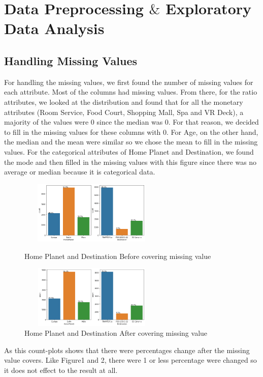 \documentclass[fleqn,10pt]{SelfArx} %
\begin{document}
\bigskip
\bigskip


\section{Data Preprocessing $\&$ Exploratory Data Analysis} %

\subsection{Handling Missing Values}
For handling the missing values, we first found the number of missing values for each attribute. Most of the columns had missing values. From there, for the ratio attributes, we looked at the distribution and found that for all the monetary attributes (Room Service, Food Court, Shopping Mall, Spa and VR Deck), a majority of the values were 0 since the median was 0. For that reason, we decided to fill in the missing values for these columns with 0. For Age, on the other hand, the median and the mean were similar so we chose the mean to fill in the missing values. For the categorical attributes of Home Planet and Destination, we found the mode and then filled in the missing values with this figure since there was no average or median because it is categorical data.

\begin{figure}[H]
    \centering
    \includegraphics[width=7cm,height=3cm]{img/output.png}
    \caption{Home Planet and Destination Before covering missing value}
    \label{fig:my_label}
    \centering
    \includegraphics[width=7cm,height=3cm]{img/spaceshiptwithplanetanddestination.png}
    \caption{Home Planet and Destination After covering missing value}
    \label{fig:my_label}
\end{figure}
As this count-plots shows that there were percentages change after the missing value covers. Like Figure1 and 2, there were 1 or less percentage were changed so it does not effect to the result at all. 
\end{document}
